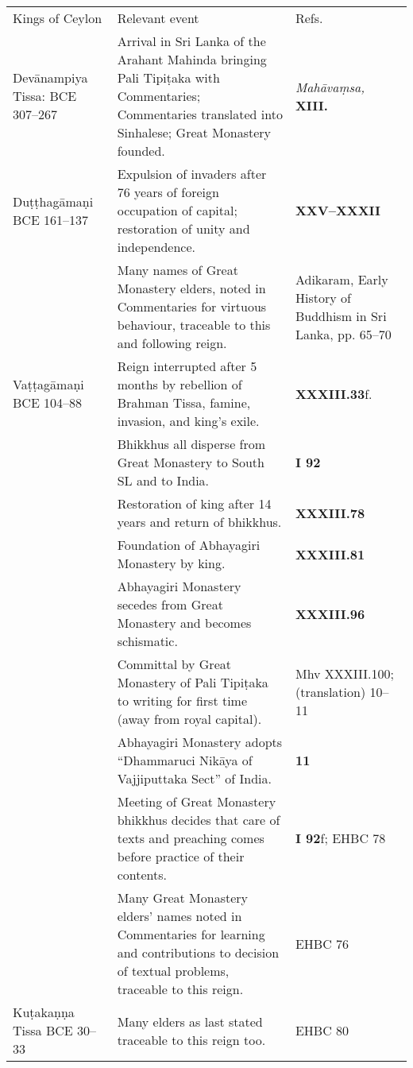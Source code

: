 

\ifplastex
\begin{tabular}{l|l|l}
    Kings of Ceylon & Relevant event & Refs.\\
    Devānampiya Tissa:  BCE 307–267   & Arrival in Sri Lanka of the Arahant Mahinda bringing Pali Tipiṭaka with Commentaries; Commentaries translated into Sinhalese; Great Monastery founded.  & \emph{Mahāvaṃsa, }\textbf{\cite{Mhv} XIII.}\emph{  }\\
    Duṭṭhagāmaṇi BCE 161–137 & Expulsion of invaders after 76 years of foreign occupation of capital; restoration of unity and independence.   & \textbf{\cite{Mhv} XXV–XXXII} \\
     & Many names of Great Monastery elders, noted in Commentaries for virtuous behaviour, traceable to this and following reign.  & Adikaram, Early History of Buddhism in Sri Lanka, pp. 65–70 \\
    Vaṭṭagāmaṇi  BCE 104–88  & Reign interrupted after 5 months by rebellion of Brahman Tissa, famine, invasion, and king’s exile. & \textbf{\cite{Mhv} XXXIII.33}f. \\
     & Bhikkhus all disperse from Great Monastery to South SL and to India.   & \textbf{\cite{A-a} I 92}\\
     & Restoration of king after 14 years and return of bhikkhus. & \textbf{\cite{Mhv} XXXIII.78}\\
     & Foundation of Abhayagiri Monastery by king.  & \textbf{\cite{Mhv} XXXIII.81}  \\
     & Abhayagiri Monastery secedes from Great Monastery and becomes schismatic. & \textbf{\cite{Mhv} XXXIII.96}\\
     & Committal by Great Monastery of Pali Tipiṭaka to writing for first time (away from royal capital).  & Mhv XXXIII.100;  \textbf{\cite{Nikāya-s}} (translation) 10–11  \\
     & Abhayagiri Monastery adopts  “Dhammaruci Nikāya of Vajjiputtaka Sect” of India.  & \textbf{\cite{Nikāya-s} 11}\\
     & Meeting of Great Monastery bhikkhus  decides that care of texts and preaching  comes before practice of their contents.  & \textbf{\cite{A-a} I 92}f; EHBC 78\\
     & Many Great Monastery elders’ names noted  in Commentaries for learning and contributions to decision of textual  problems, traceable to this reign. & EHBC 76 \\
    Kuṭakaṇṇa Tissa BCE 30–33 & Many elders as last stated traceable to this reign too. & EHBC 80 \\

\end{tabular}
